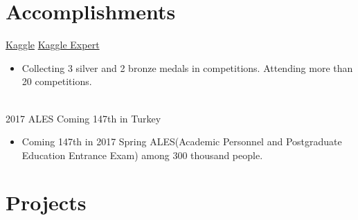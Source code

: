 \documentclass[letterpaper]{DS_class_file} %
\begin{document}
\section{Accomplishments}

\begin{twenty} %
	\twentyitem
	{\href{https://www.kaggle.com}{Kaggle}}
	{}
	{\hspace{0.3cm}\href{https://www.kaggle.com/mbkinaci}{Kaggle Expert}}
	{}
	{}
	{
		{\begin{itemize}
				\item Collecting 3 silver and 2 bronze medals in competitions. Attending more than 20 competitions.
		\end{itemize}}
	}
	\\
	\twentyitem
	{2017 ALES}
	{}
	{\hspace{0.3cm}Coming 147th in Turkey}
	{}
	{}
	{
		{\begin{itemize}
				\item Coming 147th in 2017 Spring ALES(Academic Personnel and Postgraduate Education Entrance Exam) among 300 thousand people.
		\end{itemize}}
	}

\end{twenty}

\section{Projects}
\end{document}
